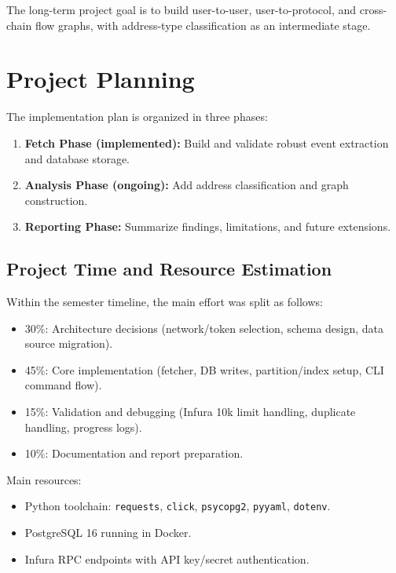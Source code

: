 \documentclass[a4paper,12pt]{report}
\begin{document}
The long-term project goal is to build user-to-user, user-to-protocol, and cross-chain flow graphs,
with address-type classification as an intermediate stage.

\section{Project Planning}
The implementation plan is organized in three phases:
\begin{enumerate}
\item \textbf{Fetch Phase (implemented):} Build and validate robust event extraction and database
storage.
\item \textbf{Analysis Phase (ongoing):} Add address classification and graph construction.
\item \textbf{Reporting Phase:} Summarize findings, limitations, and future extensions.
\end{enumerate}

\subsection{Project Time and Resource Estimation}
Within the semester timeline, the main effort was split as follows:
\begin{itemize}
\item 30\%: Architecture decisions (network/token selection, schema design, data source migration).
\item 45\%: Core implementation (fetcher, DB writes, partition/index setup, CLI command flow).
\item 15\%: Validation and debugging (Infura 10k limit handling, duplicate handling, progress logs).
\item 10\%: Documentation and report preparation.
\end{itemize}

Main resources:
\begin{itemize}
\item Python toolchain: \texttt{requests}, \texttt{click}, \texttt{psycopg2}, \texttt{pyyaml}, \texttt{dotenv}.
\item PostgreSQL 16 running in Docker.
\item Infura RPC endpoints with API key/secret authentication.
\end{itemize}
\end{document}
